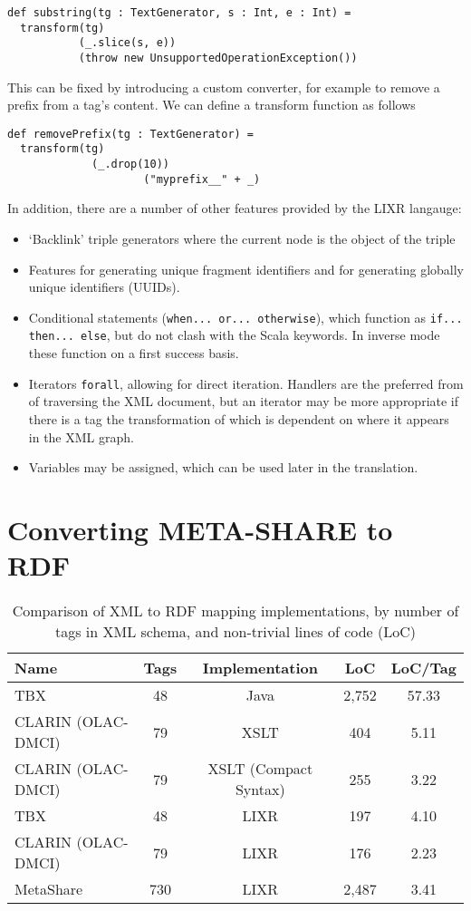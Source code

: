 \documentclass{acm_proc_article-sp}
\begin{document}
\begin{verbatim}
def substring(tg : TextGenerator, s : Int, e : Int) =
  transform(tg)
           (_.slice(s, e))
           (throw new UnsupportedOperationException())
\end{verbatim}

This can be fixed by introducing a custom converter, for example to remove a 
prefix from a tag's content. We can define a transform function as follows

\begin{verbatim}
def removePrefix(tg : TextGenerator) =
  transform(tg)
	         (_.drop(10))
					 ("myprefix__" + _) 
\end{verbatim}

In addition, there are a number of other features provided by the LIXR langauge:

\begin{itemize}
\item `Backlink' triple generators where the current node is the object of the triple
\item Features for generating unique fragment identifiers and for generating globally unique 
identifiers (UUIDs).
\item Conditional statements ({\tt when... or... otherwise}), which function as
{\tt if... then... else}, but do not clash with the Scala keywords. In inverse mode
these function on a first success basis.
\item Iterators {\tt forall}, allowing for direct iteration. Handlers are the 
preferred from of traversing the XML document, but an iterator may be more appropriate 
if there is a tag the transformation of which is dependent on where it appears in the
XML graph.
\item Variables may be assigned, which can be used later in the translation.
\end{itemize}

\section{Converting META-SHARE to RDF}
\label{sec:metashare}
\begin{table*}
\begin{center}
\begin{tabular}{p{4cm}|cccc}
Name & Tags & Implementation & LoC & LoC/Tag \\
\hline
TBX & 48 & Java & 2,752 & 57.33 \\
CLARIN (OLAC-DMCI) & 79 & XSLT & 404 & 5.11 \\
CLARIN (OLAC-DMCI) & 79 & XSLT (Compact Syntax) & 255 & 3.22 \\
\hline
TBX & 48 & LIXR & 197 & 4.10 \\
CLARIN (OLAC-DMCI) & 79 & LIXR & 176 & 2.23 \\
MetaShare & 730 & LIXR & 2,487 & 3.41 \\
\end{tabular}
\end{center}
\caption{\label{tab:locs}Comparison of XML to RDF mapping implementations,
by number of tags in XML schema, and non-trivial lines of code (LoC)}
\end{table*}
\end{document}
